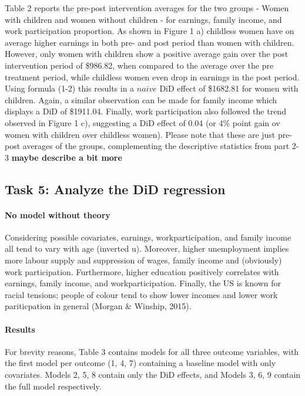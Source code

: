 \documentclass[a4paper]{article}
\begin{document}
Table 2 reports the pre-post intervention averages for the two groups - Women with children and women without children - for earnings, family income, and work participation proportion. As shown in Figure 1 a) childless women have on average higher earnings in both pre- and post period than women with children. However, only women with children show a positive average gain over the post intervention period of \$986.82, when compared to the average over the pre treatment period, while childless women even drop in earnings in the post period. Using formula (1-2) this results in a $naive$ DiD effect of \$1682.81 for women with children. Again, a similar observation can be made for family income which displays a DiD of \$1911.04. Finally, work participation also followed the trend observed in Figure 1 c), suggesting a DiD effect of 0.04 (or 4\% point gain ov women with children over childless women). Please note that these are just pre-post averages of the groups, complementing the descriptive statistics from part 2-3
\textbf{maybe describe a bit more}

\subsection{Task 5: Analyze the DiD regression}



\paragraph{No model without theory} Considering possible covariates, earnings, workparticipation, and family income all tend to vary with age (inverted u). Moreover, higher unemployment implies more labour supply and suppression of wages, family income and (obviously) work participation. Furthermore, higher education positively correlates with earnings, family income, and workparticipation. Finally, the US is known for racial tensions; people of colour tend to show lower incomes and lower work pariticpation in general (Morgan \& Winship, 2015). 



\paragraph{Results} For brevity reasons, Table 3 contains models for all three outcome variables, with the first model per outcome (1, 4, 7) containing a baseline model with only covariates. Models 2, 5, 8 contain only the DiD effects, and Models 3, 6, 9 contain the full model respectively. 
\end{document}
